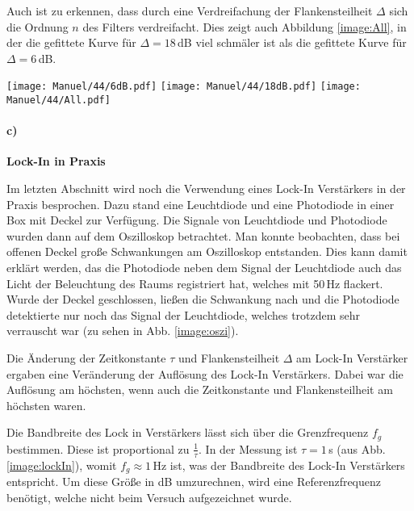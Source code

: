 Auch ist zu erkennen, dass durch eine Verdreifachung der Flankensteilheit $\Delta$ sich die Ordnung $n$ des Filters verdreifacht. Dies zeigt auch Abbildung \ref{image:All}, in der die gefittete Kurve für $\Delta=18$\,dB viel schmäler ist als die gefittete Kurve für $\Delta=6$\,dB.
\newpage
\begin{center}
    \texttt{[image: Manuel/44/6dB.pdf]}
    \label{image:6dB}
    \vspace{1cm}
    \texttt{[image: Manuel/44/18dB.pdf]}
    \label{image:18dB}
    \vspace{1cm}
    \texttt{[image: Manuel/44/All.pdf]}
    \label{image:All}
\end{center}

\paragraph{c)}\textbf{Lock-In in Praxis}

Im letzten Abschnitt wird noch die Verwendung eines Lock-In Verstärkers in der Praxis besprochen. Dazu stand eine Leuchtdiode und eine Photodiode in einer Box mit Deckel zur Verfügung. Die Signale von Leuchtdiode und Photodiode wurden dann auf dem Oszilloskop betrachtet. Man konnte beobachten, dass bei offenen Deckel große Schwankungen am Oszilloskop entstanden. Dies kann damit erklärt werden, das die Photodiode neben dem Signal der Leuchtdiode auch das Licht der Beleuchtung des Raums registriert hat, welches mit 50\,Hz flackert. Wurde der Deckel geschlossen, ließen die Schwankung nach und die Photodiode detektierte nur noch das Signal der Leuchtdiode, welches trotzdem sehr verrauscht war (zu sehen in Abb. \ref{image:oszi}). 

Die Änderung der Zeitkonstante $\tau$ und Flankensteilheit $\Delta$ am Lock-In Verstärker ergaben eine Veränderung der Auflösung des Lock-In Verstärkers. Dabei war die Auflösung am höchsten, wenn auch die Zeitkonstante und Flankensteilheit am höchsten waren.

Die Bandbreite des Lock in Verstärkers lässt sich über die Grenzfrequenz $f_g$ bestimmen. Diese ist proportional zu $\frac{1}{\tau}$. In der Messung ist $\tau = 1$\,s (aus Abb. \ref{image:lockIn}), womit $f_g\approx 1$\,Hz ist, was der Bandbreite des Lock-In Verstärkers entspricht. Um diese Größe in dB umzurechnen, wird eine Referenzfrequenz benötigt, welche nicht beim Versuch aufgezeichnet wurde.